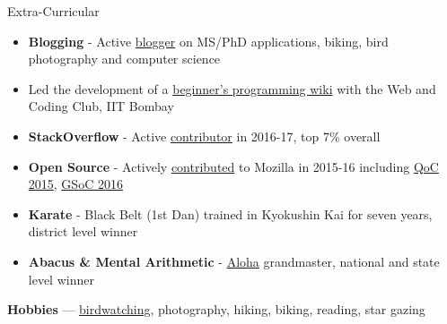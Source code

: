 \documentclass{resume} %
\begin{document}
\begin{rSection}{Extra-Curricular}
\begin{itemize}[leftmargin=*]
\item \textbf{Blogging} - Active \href{http://martiansideofthemoon.github.io/archive.html}{blogger} on MS/PhD applications, biking, bird photography and computer science
\item Led the development of a \href{https://www.wncc-iitb.org/wiki/index.php/The_Web_and_Coding_Club}{beginner's programming wiki} with the Web and Coding Club, IIT Bombay
\item \textbf{StackOverflow} - Active \href{https://stackoverflow.com/users/5080995/martianwars}{contributor} in 2016-17, top 7\% overall
\item \textbf{Open Source} - Actively \href{http://martiansideofthemoon.github.io/open_source/}{contributed} to Mozilla in 2015-16 including \href{https://wiki.mozilla.org/Auto-tools/New_Contributor/Quarter_of_Contribution}{QoC 2015}, \href{https://summerofcode.withgoogle.com/archive/2016/projects/}{GSoC 2016}
\item \textbf{Karate} - Black Belt (1st Dan) trained in Kyokushin Kai for seven years, district level winner
\item \textbf{Abacus \& Mental Arithmetic} - \href{https://alohamindmath.com/}{Aloha} grandmaster, national and state level winner
\end{itemize}
\textbf{Hobbies} --- \href{https://martiansideofthemoon.github.io/birding/}{birdwatching}, photography, hiking, biking, reading, star gazing
\end{rSection}
\end{document}
